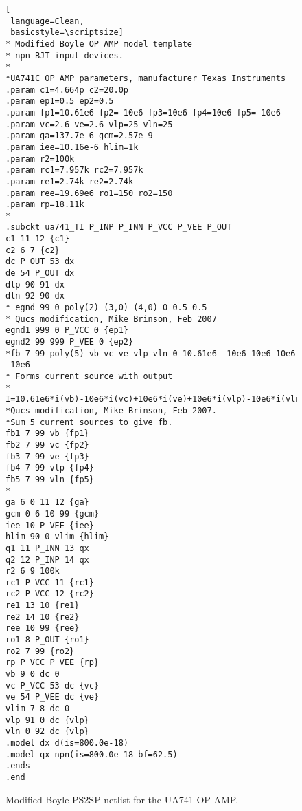 \begin{figure} 
  \centering
\begin{lstlisting}[
 language=Clean, 
 basicstyle=\scriptsize]
* Modified Boyle OP AMP model template
* npn BJT input devices.
*
*UA741C OP AMP parameters, manufacturer Texas Instruments
.param c1=4.664p c2=20.0p
.param ep1=0.5 ep2=0.5
.param fp1=10.61e6 fp2=-10e6 fp3=10e6 fp4=10e6 fp5=-10e6
.param vc=2.6 ve=2.6 vlp=25 vln=25
.param ga=137.7e-6 gcm=2.57e-9
.param iee=10.16e-6 hlim=1k
.param r2=100k
.param rc1=7.957k rc2=7.957k
.param re1=2.74k re2=2.74k
.param ree=19.69e6 ro1=150 ro2=150
.param rp=18.11k
*
.subckt ua741_TI P_INP P_INN P_VCC P_VEE P_OUT 
c1 11 12 {c1}
c2 6 7 {c2}
dc P_OUT 53 dx
de 54 P_OUT dx
dlp 90 91 dx
dln 92 90 dx
* egnd 99 0 poly(2) (3,0) (4,0) 0 0.5 0.5
* Qucs modification, Mike Brinson, Feb 2007
egnd1 999 0 P_VCC 0 {ep1}
egnd2 99 999 P_VEE 0 {ep2}
*fb 7 99 poly(5) vb vc ve vlp vln 0 10.61e6 -10e6 10e6 10e6 -10e6
* Forms current source with output
* I=10.61e6*i(vb)-10e6*i(vc)+10e6*i(ve)+10e6*i(vlp)-10e6*i(vln)
*Qucs modification, Mike Brinson, Feb 2007.
*Sum 5 current sources to give fb.
fb1 7 99 vb {fp1}
fb2 7 99 vc {fp2}
fb3 7 99 ve {fp3}
fb4 7 99 vlp {fp4}
fb5 7 99 vln {fp5}
*
ga 6 0 11 12 {ga}
gcm 0 6 10 99 {gcm}
iee 10 P_VEE {iee}
hlim 90 0 vlim {hlim}
q1 11 P_INN 13 qx
q2 12 P_INP 14 qx
r2 6 9 100k
rc1 P_VCC 11 {rc1}
rc2 P_VCC 12 {rc2}
re1 13 10 {re1}
re2 14 10 {re2}
ree 10 99 {ree}
ro1 8 P_OUT {ro1}
ro2 7 99 {ro2}
rp P_VCC P_VEE {rp}
vb 9 0 dc 0
vc P_VCC 53 dc {vc}
ve 54 P_VEE dc {ve}
vlim 7 8 dc 0
vlp 91 0 dc {vlp}
vln 0 92 dc {vlp}
.model dx d(is=800.0e-18)
.model qx npn(is=800.0e-18 bf=62.5)
.ends
.end
\end{lstlisting}
  \caption{Modified Boyle PS2SP netlist for the UA741 OP AMP. } 
  \label{fig:opamp51}
\end{figure}

